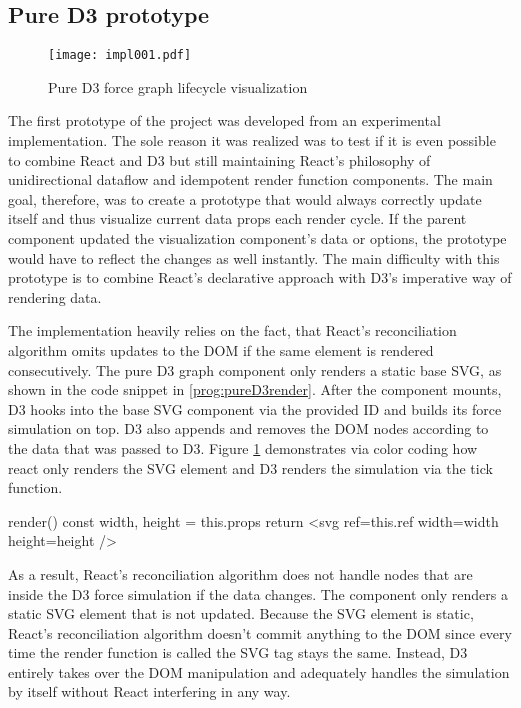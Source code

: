 \subsection{Pure D3 prototype}

\begin{figure}
\centering
\texttt{[image: impl001.pdf]}
\caption{Pure D3 force graph lifecycle visualization}
\label{fig:pureD3Lifecycle}
\end{figure}

The first prototype of the project was developed from an experimental implementation. The sole reason it was realized was to test if it is even possible to combine React and D3 but still maintaining React's philosophy of unidirectional dataflow and idempotent render function components. The main goal, therefore, was to create a prototype that would always correctly update itself and thus visualize current data props each render cycle. If the parent component updated the visualization component's data or options, the prototype would have to reflect the changes as well instantly. The main difficulty with this prototype is to combine React's declarative approach with D3's imperative way of rendering data.

The implementation heavily relies on the fact, that React's reconciliation algorithm omits updates to the DOM if the same element is rendered consecutively. The pure D3 graph component only renders a static base SVG, as shown in the code snippet in \ref{prog:pureD3render}. After the component mounts, D3 hooks into the base SVG component via the provided ID and builds its force simulation on top. D3 also appends and removes the DOM nodes according to the data that was passed to D3. Figure \ref{fig:pureD3Lifecycle} demonstrates via color coding how react only renders the SVG element and D3 renders the simulation via the tick function.

\begin{program}[H]
\caption{Render function of the pure D3 prototype}
\label{prog:pureD3render}
\begin{JsCode}
render() {
  const { width, height } = this.props
  return <svg ref={this.ref} width={width} height={height} />
}
\end{JsCode}
\end{program}

As a result, React's reconciliation algorithm does not handle nodes that are inside the D3 force simulation if the data changes. The component only renders a static SVG element that is not updated. Because the SVG element is static, React's reconciliation algorithm doesn't commit anything to the DOM since every time the render function is called the SVG tag stays the same. Instead, D3 entirely takes over the DOM manipulation and adequately handles the simulation by itself without React interfering in any way.

